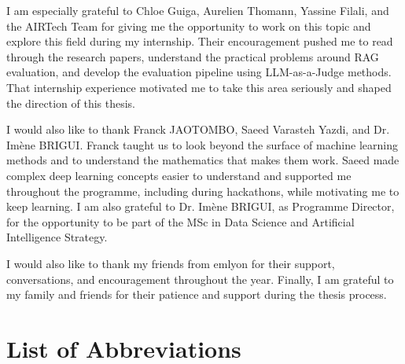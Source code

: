 I am especially grateful to Chloe Guiga, Aurelien Thomann, Yassine Filali, and the AIRTech Team for giving me the opportunity to work on this topic and explore this field during my internship. Their encouragement pushed me to read through the research papers, understand the practical problems around RAG evaluation, and develop the evaluation pipeline using LLM-as-a-Judge methods. That internship experience motivated me to take this area seriously and shaped the direction of this thesis.

I would also like to thank Franck JAOTOMBO, Saeed Varasteh Yazdi, and Dr. Imène BRIGUI. Franck taught us to look beyond the surface of machine learning methods and to understand the mathematics that makes them work. Saeed made complex deep learning concepts easier to understand and supported me throughout the programme, including during hackathons, while motivating me to keep learning. I am also grateful to Dr. Imène BRIGUI, as Programme Director, for the opportunity to be part of the MSc in Data Science and Artificial Intelligence Strategy.

I would also like to thank my friends from emlyon for their support, conversations, and encouragement throughout the year. Finally, I am grateful to my family and friends for their patience and support during the thesis process.


\clearpage
\tableofcontents

\listoffigures

\listoftables

\chapter*{List of Abbreviations}

